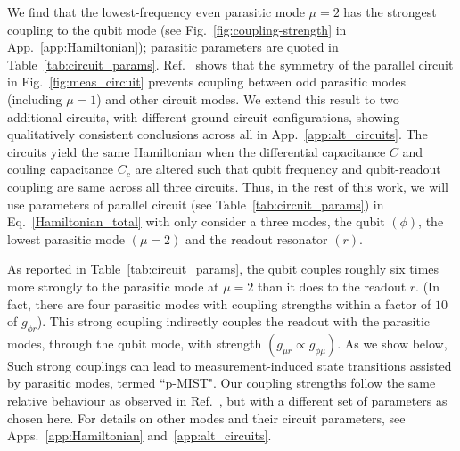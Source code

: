 \documentclass[%
reprint,
superscriptaddress,
 amsmath,amssymb,
 aps,
 prx,
longbibliography,
floatfix,
]{revtex4-2}
\newcommand{\ER}[1]{{\color{purple}{{}[ER: #1]}}}
\begin{document}
 We find that the lowest-frequency even parasitic mode $\mu=2$ has the strongest coupling to the qubit mode (see Fig.~\ref{fig:coupling-strength} in App.~\ref{app:Hamiltonian}); parasitic parameters are quoted in Table~\ref{tab:circuit_params}. Ref.~\cite{viola2015collective} shows that the symmetry of the parallel circuit in Fig.~\ref{fig:meas_circuit} prevents coupling between odd parasitic modes (including $\mu=1$) and other circuit modes. We extend this result to two additional circuits, with different ground circuit configurations, showing qualitatively consistent conclusions across all in App.~\ref{app:alt_circuits}. The circuits yield the same Hamiltonian when the differential capacitance $C$ and couling capacitance $C_c$ are altered such that qubit frequency and qubit-readout coupling are same across all three circuits. Thus, in the rest of this work, we will use parameters of parallel circuit (see Table~\ref{tab:circuit_params}) in Eq.~\ref{Hamiltonian_total} with only consider a three modes, the qubit $(\phi)$, the lowest parasitic mode $(\mu=2)$ and the readout resonator $(r)$. 
 
As reported in Table~\ref{tab:circuit_params}, the qubit couples roughly six times more strongly to the parasitic mode at $\mu=2$ than it does to the readout $r$. (In fact, there are four parasitic modes with coupling strengths within a factor of $10$ of $g_{\phi r}$). This strong coupling indirectly couples the readout with the parasitic modes, through the qubit mode, with strength $(g_{\mu r}\propto g_{\phi\mu})$. As we show below, Such strong couplings can lead to measurement-induced state transitions assisted by parasitic modes, termed ``p-MIST". %
Our coupling strengths follow the same relative behaviour as observed in Ref.~\cite{viola2015collective}, but with a different set of parameters as chosen here. For details on other modes and their circuit parameters, see Apps.~\ref{app:Hamiltonian} and~\ref{app:alt_circuits}. 

\end{document}
